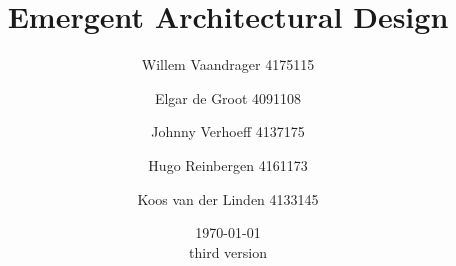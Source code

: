 
\title{{\Huge Emergent Architectural Design}}
\author{Willem Vaandrager 4175115 \\
\and Elgar de Groot 4091108 \\
\and Johnny Verhoeff 4137175 \\
\and Hugo Reinbergen 4161173 \\
\and Koos van der Linden 4133145}
\date{\today \\ third version}
\maketitle